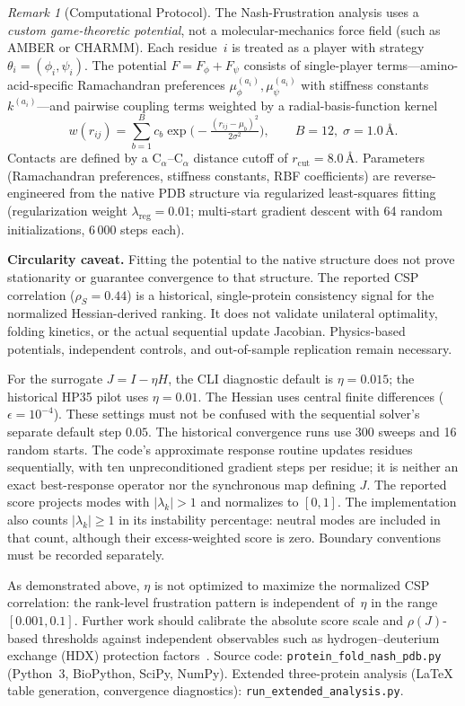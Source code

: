 \documentclass[12pt,a4paper]{article}
\theoremstyle{remark}
\newtheorem{remark}{Remark}
\begin{document}
\begin{remark}[Computational Protocol]\label{rem:comp-protocol}
The Nash-Frustration analysis uses a \emph{custom game-theoretic potential}, not a molecular-mechanics force field (such as AMBER or CHARMM).
Each residue~$i$ is treated as a player with strategy $\theta_i = (\phi_i, \psi_i)$.
The potential $F = F_\phi + F_\psi$ consists of single-player terms---amino-acid-specific Ramachandran preferences $\mu_\phi^{(a_i)}, \mu_\psi^{(a_i)}$ with stiffness constants~$k^{(a_i)}$---and pairwise coupling terms weighted by a radial-basis-function kernel
\[
  w(r_{ij}) = \sum_{b=1}^{B} c_b \exp\!\bigl(-\tfrac{(r_{ij}-\mu_b)^2}{2\sigma^2}\bigr),
  \qquad B=12,\; \sigma = 1.0\,\text{\AA}.
\]
Contacts are defined by a C$_\alpha$--C$_\alpha$ distance cutoff of $r_\text{cut} = 8.0$\,\AA.
Parameters (Ramachandran preferences, stiffness constants, RBF coefficients) are reverse-engineered from the native PDB structure via regularized least-squares fitting (regularization weight $\lambda_{\text{reg}} = 0.01$; multi-start gradient descent with 64 random initializations, 6\,000 steps each).

\textbf{Circularity caveat.} Fitting the potential to the native structure does not prove stationarity or guarantee convergence to that structure. The reported CSP correlation ($\rho_S=0.44$) is a historical, single-protein consistency signal for the normalized Hessian-derived ranking. It does not validate unilateral optimality, folding kinetics, or the actual sequential update Jacobian. Physics-based potentials, independent controls, and out-of-sample replication remain necessary.

For the surrogate $J=I-\eta H$, the CLI diagnostic default is $\eta=0.015$; the historical HP35 pilot uses $\eta=0.01$. The Hessian uses central finite differences ($\epsilon=10^{-4}$). These settings must not be confused with the sequential solver's separate default step $0.05$.
The historical convergence runs use 300 sweeps and 16 random starts. The code's approximate response routine updates residues sequentially, with ten unpreconditioned gradient steps per residue; it is neither an exact best-response operator nor the synchronous map defining $J$.
The reported score projects modes with $|\lambda_k|>1$ and normalizes to $[0,1]$. The implementation also counts $|\lambda_k|\geq1$ in its instability percentage: neutral modes are included in that count, although their excess-weighted score is zero. Boundary conventions must be recorded separately.

As demonstrated above, $\eta$ is not optimized to maximize the normalized CSP correlation: the rank-level frustration pattern is independent of~$\eta$ in the range $[0.001, 0.1]$. Further work should calibrate the absolute score scale and $\rho(J)$-based thresholds against independent observables such as hydrogen--deuterium exchange (HDX) protection factors~\citep{McKnight1996}.
Source code: \texttt{protein\_fold\_nash\_pdb.py} (Python~3, BioPython, SciPy, NumPy).
Extended three-protein analysis (LaTeX table generation, convergence diagnostics): \texttt{run\_extended\_analysis.py}.
\end{remark}
\end{document}
